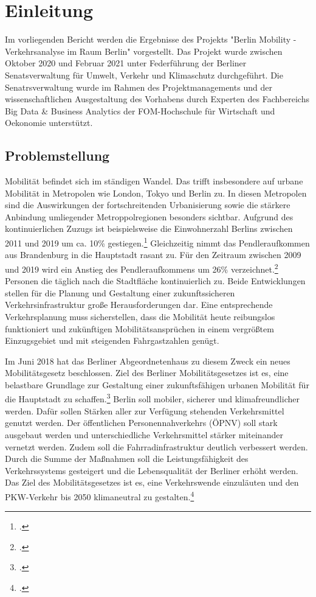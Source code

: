 \section{Einleitung}
Im vorliegenden Bericht werden die Ergebnisse des Projekts "Berlin Mobility - Verkehrsanalyse im Raum Berlin" vorgestellt. Das Projekt wurde zwischen Oktober 2020 und Februar 2021 unter Federführung der Berliner Senatsverwaltung für Umwelt, Verkehr und Klimaschutz durchgeführt. Die Senatrsverwaltung wurde im Rahmen des Projektmanagements und der wissenschaftlichen Ausgestaltung des Vorhabens durch Experten des Fachbereichs Big Data \& Business Analytics der FOM-Hochschule für Wirtschaft und Oekonomie unterstützt.

\subsection{Problemstellung}
Mobilität befindet sich im ständigen Wandel. Das trifft insbesondere auf urbane Mobilität in Metropolen wie London, Tokyo und Berlin zu. In diesen Metropolen sind die Auswirkungen der fortschreitenden Urbanisierung sowie die stärkere Anbindung umliegender Metroppolregionen besonders sichtbar. Aufgrund des kontinuierlichen Zuzugs ist beispielsweise die Einwohnerzahl Berlins zwischen 2011 und 2019 um ca. 10\% gestiegen.\footcite{Statista.2020} Gleichzeitig nimmt das Pendleraufkommen aus Brandenburg in die Hauptstadt rasant zu. Für den Zeitraum zwischen 2009 und 2019 wird ein Anstieg des Pendleraufkommens um 26\% verzeichnet.\footcite{VBB-Pendlerblatt.2020} Personen die täglich nach die Stadtfläche kontinuierlich zu. Beide Entwicklungen stellen für die Planung und Gestaltung einer zukunftssicheren Verkehrsinfrastruktur große Herausforderungen dar. Eine entsprechende Verkehrsplanung muss sicherstellen, dass die Mobilität heute reibungslos funktioniert und zukünftigen Mobilitätsansprüchen in einem vergrößtem Einzugsgebiet und mit steigenden Fahrgastzahlen genügt.

Im Juni 2018 hat das Berliner Abgeordnetenhaus zu diesem Zweck ein neues Mobilitätsgesetz beschlossen. Ziel des Berliner Mobilitätsgesetzes ist es, eine belastbare Grundlage zur Gestaltung einer zukunftsfähigen urbanen Mobilität für die Hauptstadt zu schaffen.\footcite{Mobilitaetsgesetz.2020} Berlin soll mobiler, sicherer und klimafreundlicher werden. Dafür sollen Stärken aller zur Verfügung stehenden Verkehrsmittel genutzt werden. Der öffentlichen Personennahverkehrs (ÖPNV) soll stark ausgebaut werden und unterschiedliche Verkehrsmittel stärker miteinander vernetzt werden. Zudem soll die Fahrradinfrastruktur deutlich verbessert werden. Durch die Summe der Maßnahmen soll die Leistungsfähigkeit des Verkehrssystems gesteigert und die Lebensqualität der Berliner erhöht werden. Das Ziel des Mobilitätsgesetzes ist es, eine Verkehrswende einzuläuten und den PKW-Verkehr bis 2050 klimaneutral zu gestalten.\footcite{Mobilitaetsgesetz.2020} 

